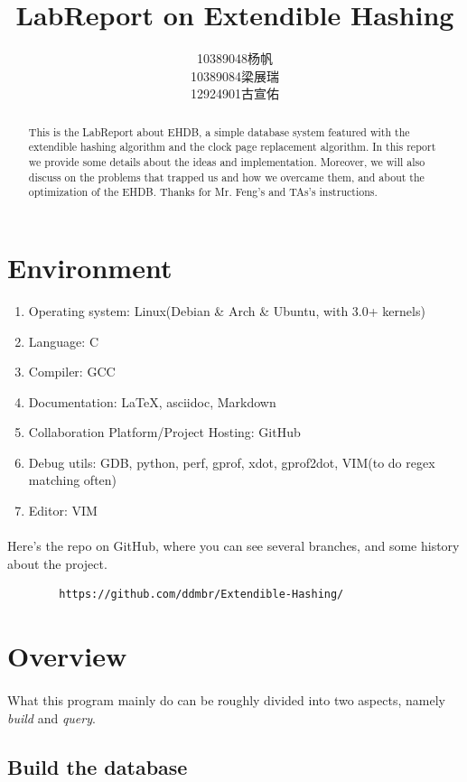 \documentclass{article}
\title{LabReport on Extendible Hashing}
\author{10389048杨帆 \\ 10389084梁展瑞 \\ 12924901古宣佑}
\begin{document}
\maketitle
\begin{abstract}
    This is the LabReport about EHDB, a simple database system featured with the extendible hashing algorithm and the clock page replacement algorithm. In this report we provide some details about the ideas and implementation. Moreover, we will also discuss on the problems that trapped us and how we overcame them, and about the optimization of the EHDB. Thanks for Mr. Feng's and TAs's instructions.
\end{abstract}
\section{Environment}
    \begin{enumerate}
        \item Operating system: Linux(Debian \& Arch \& Ubuntu, with 3.0+ kernels)
        \item Language: C
        \item Compiler: GCC
        \item Documentation: \LaTeX , asciidoc, Markdown
        \item Collaboration Platform/Project Hosting: GitHub
        \item Debug utils: GDB, python, perf, gprof, xdot, gprof2dot, VIM(to do regex matching often)
        \item Editor: VIM
    \end{enumerate}
    \paragraph{}
        Here's the repo on GitHub, where you can see several branches, and some history about the project.
    \begin{verbatim}
        https://github.com/ddmbr/Extendible-Hashing/
    \end{verbatim}
\section{Overview}
    \paragraph{}
        What this program mainly do can be roughly divided into two aspects, namely \emph{build} and \emph{query}.
    \subsection{Build the database}
\end{document}
